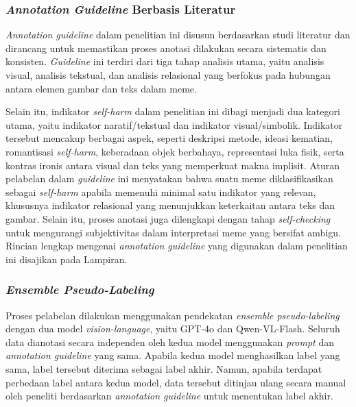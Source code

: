 \subsubsection{\textit{Annotation Guideline} Berbasis Literatur} \label{subsubsec:annotation_guideline_berbasis_literatur}
\textit{Annotation guideline} dalam penelitian ini disusun berdasarkan studi literatur dan dirancang untuk memastikan proses anotasi dilakukan secara sistematis dan konsisten. \textit{Guideline} ini terdiri dari tiga tahap analisis utama, yaitu analisis visual, analisis tekstual, dan analisis relasional yang berfokus pada hubungan antara elemen gambar dan teks dalam meme.

Selain itu, indikator \textit{self-harm} dalam penelitian ini dibagi menjadi dua kategori utama, yaitu indikator naratif/tekstual dan indikator visual/simbolik. Indikator tersebut mencakup berbagai aspek, seperti deskripsi metode, ideasi kematian, romantisasi \textit{self-harm}, keberadaan objek berbahaya, representasi luka fisik, serta kontras ironis antara visual dan teks yang memperkuat makna implisit. Aturan pelabelan dalam \textit{guideline} ini menyatakan bahwa suatu meme diklasifikasikan sebagai \textit{self-harm} apabila memenuhi minimal satu indikator yang relevan, khususnya indikator relasional yang menunjukkan keterkaitan antara teks dan gambar. Selain itu, proses anotasi juga dilengkapi dengan tahap \textit{self-checking} untuk mengurangi subjektivitas dalam interpretasi meme yang bersifat ambigu. Rincian lengkap mengenai \textit{annotation guideline} yang digunakan dalam penelitian ini disajikan pada Lampiran.


\subsubsection{\textit{Ensemble Pseudo-Labeling}} \label{subsubsec:ensemble_pseudo_labeling}
Proses pelabelan dilakukan menggunakan pendekatan \textit{ensemble pseudo-labeling} dengan dua model \textit{vision-language}, yaitu GPT-4o dan Qwen-VL-Flash. 
Seluruh data dianotasi secara independen oleh kedua model menggunakan \textit{prompt} dan \textit{annotation guideline} yang sama. Apabila kedua model menghasilkan label yang sama, label tersebut diterima sebagai label akhir. Namun, apabila terdapat perbedaan label antara kedua model, data tersebut ditinjau ulang secara manual oleh peneliti berdasarkan \textit{annotation guideline} untuk menentukan label akhir.

